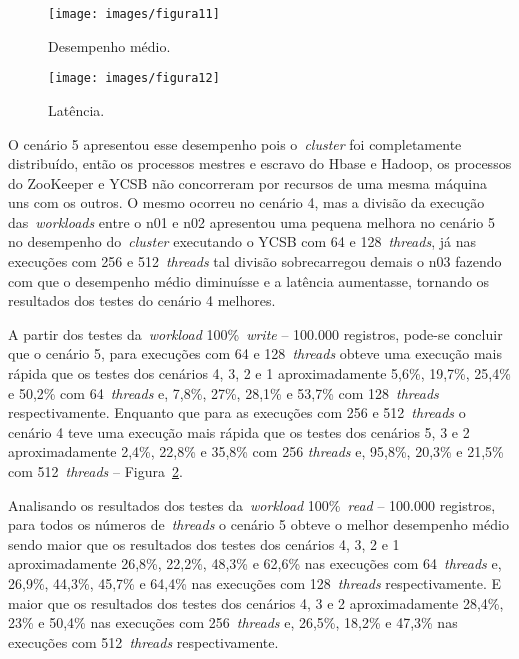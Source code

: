 \documentclass[12pt]{article}
\begin{document}
\begin{figure*}
    \centering
    \begin{subfigure}[b]{0.49\textwidth}
        \centering
        \texttt{[image: images/figura11]}
        \caption{Desempenho médio.}
        \label{figura11}
    \end{subfigure}
        \hfill
    \begin{subfigure}[b]{0.49\textwidth}  
        \centering 
        \texttt{[image: images/figura12]}
        \caption{Latência.}%
        \label{figura12}
    \end{subfigure}
    \caption{\emph{Workload} 100\%~\emph{write} -- 100.000 registros nos cenários de 1 a 5.}
\end{figure*}

O cenário 5 apresentou esse desempenho pois o~\emph{cluster} foi completamente distribuído, então os processos mestres e escravo do Hbase e Hadoop, os processos do ZooKeeper e YCSB não concorreram por recursos de uma mesma máquina uns com os outros. O mesmo ocorreu no cenário 4, mas a divisão da execução das~\emph{workloads} entre o n01 e n02 apresentou uma pequena melhora no cenário 5 no desempenho do~\emph{cluster}  executando o YCSB com 64 e 128~\emph{threads}, já nas execuções com 256 e 512~\emph{threads} tal divisão sobrecarregou demais o n03 fazendo com que o desempenho médio diminuísse e a latência aumentasse, tornando os resultados dos testes do cenário 4 melhores.

A partir dos testes da~\emph{workload} 100\%~\emph{write} -- 100.000 registros, pode-se concluir que o cenário 5, para execuções com 64 e 128~\emph{threads} obteve uma execução mais rápida que os testes dos cenários 4, 3, 2 e 1 aproximadamente 5,6\%, 19,7\%, 25,4\% e 50,2\% com 64~\emph{threads} e, 7,8\%, 27\%, 28,1\% e 53,7\% com 128~\emph{threads} respectivamente. Enquanto que para as execuções com 256 e 512~\emph{threads} o cenário 4 teve uma execução mais rápida que os testes dos cenários 5, 3 e 2 aproximadamente 2,4\%, 22,8\% e 35,8\% com 256 \emph{threads} e, 95,8\%, 20,3\% e 21,5\% com 512~\emph{threads} -- Figura~\ref{figura12}.

Analisando os resultados dos testes da~\emph{workload} 100\%~\emph{read} -- 100.000 registros, para todos os números de~\emph{threads} o cenário 5 obteve o melhor desempenho médio sendo maior que os resultados dos testes dos cenários 4, 3, 2 e 1 aproximadamente 26,8\%, 22,2\%, 48,3\% e 62,6\% nas execuções com 64~\emph{threads} e, 26,9\%, 44,3\%, 45,7\% e 64,4\% nas execuções com 128~\emph{threads} respectivamente. E maior que os resultados dos testes dos cenários 4, 3 e 2 aproximadamente 28,4\%, 23\% e 50,4\% nas execuções com 256~\emph{threads} e, 26,5\%, 18,2\% e 47,3\% nas execuções com 512~\emph{threads} respectivamente.
\end{document}
